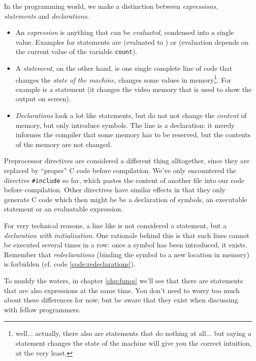 \begin{hintbox}
In the programming world, we make a distinction between \emph{expressions}, \emph{statements} and \emph{declarations}.

\begin{itemize}
\item An \emph{expression} is anything that can be \emph{evaluated}, \ie condensed into a single value. Examples for statements are  (evaluated to ) 
	or  (evaluation depends on the current value of the variable \texttt{count}).
\item A \emph{statement}, on the other hand, is one single complete line of code that changes the \emph{state of the machine}, \ie changes some values in memory\footnote{well... actually,
	there also are statements that do nothing at all... but saying a statement changes the state of the machine will give you the correct intuition, at the very least.}.
	For example  is a statement (it changes the video memory that is used to show the output on screen).
\item \emph{Declarations} look a lot like statements, but do not not change the \emph{content} of memory, but only introduce symbols.
	The line  is a declaration: it merely informes the compiler that some memory has to be reserved, but the contents of the memory are not changed.
\end{itemize}

Preprocessor directives are considered a different thing alltogether, since they are replaced by \enquote{proper} C code before compilation. We've only encountered the directive \texttt{\#include} so far, which pastes the content of another file into our code before compilation. Other directives have similar effects in that they only generate C code which then might be be a declaration of symbols, an executable statement or an evaluatable expression.

For very technical reasons, a line like  is not considered a statement, but a \emph{declaration with initialization}. One rationale behind this is that such lines cannot be executed several times in a row: once a symbol has been introduced, it exists. Remember that \emph{redeclarations} (\ie binding the symbol to a new location in memory) is forbidden (cf. code \ref{code:redeclarations}).

To muddy the waters, in chapter \ref{chp:funcs} we'll see that there are statements that are also expressions at the same time. You don't need to worry too much about these differences for now; but be aware that they exist when discussing with fellow programmers.
\end{hintbox}

